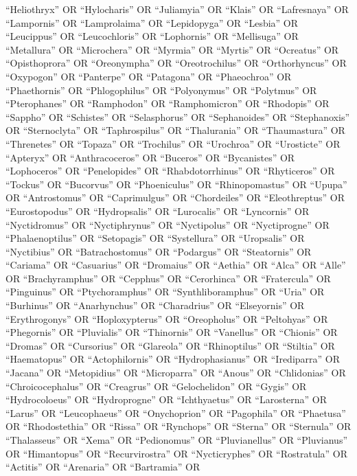\documentclass[
  number,
  review,
  onecolumn]{elsarticle}
\begin{document}
``Heliothryx'' OR ``Hylocharis'' OR ``Juliamyia'' OR ``Klais'' OR
``Lafresnaya'' OR ``Lampornis'' OR ``Lamprolaima'' OR ``Lepidopyga'' OR
``Lesbia'' OR ``Leucippus'' OR ``Leucochloris'' OR ``Lophornis'' OR
``Mellisuga'' OR ``Metallura'' OR ``Microchera'' OR ``Myrmia'' OR
``Myrtis'' OR ``Ocreatus'' OR ``Opisthoprora'' OR ``Oreonympha'' OR
``Oreotrochilus'' OR ``Orthorhyncus'' OR ``Oxypogon'' OR ``Panterpe'' OR
``Patagona'' OR ``Phaeochroa'' OR ``Phaethornis'' OR ``Phlogophilus'' OR
``Polyonymus'' OR ``Polytmus'' OR ``Pterophanes'' OR ``Ramphodon'' OR
``Ramphomicron'' OR ``Rhodopis'' OR ``Sappho'' OR ``Schistes'' OR
``Selasphorus'' OR ``Sephanoides'' OR ``Stephanoxis'' OR ``Sternoclyta''
OR ``Taphrospilus'' OR ``Thalurania'' OR ``Thaumastura'' OR
``Threnetes'' OR ``Topaza'' OR ``Trochilus'' OR ``Urochroa'' OR
``Urosticte'' OR ``Apteryx'' OR ``Anthracoceros'' OR ``Buceros'' OR
``Bycanistes'' OR ``Lophoceros'' OR ``Penelopides'' OR
``Rhabdotorrhinus'' OR ``Rhyticeros'' OR ``Tockus'' OR ``Bucorvus'' OR
``Phoeniculus'' OR ``Rhinopomastus'' OR ``Upupa'' OR ``Antrostomus'' OR
``Caprimulgus'' OR ``Chordeiles'' OR ``Eleothreptus'' OR
``Eurostopodus'' OR ``Hydropsalis'' OR ``Lurocalis'' OR ``Lyncornis'' OR
``Nyctidromus'' OR ``Nyctiphrynus'' OR ``Nyctipolus'' OR ``Nyctiprogne''
OR ``Phalaenoptilus'' OR ``Setopagis'' OR ``Systellura'' OR
``Uropsalis'' OR ``Nyctibius'' OR ``Batrachostomus'' OR ``Podargus'' OR
``Steatornis'' OR ``Cariama'' OR ``Casuarius'' OR ``Dromaius'' OR
``Aethia'' OR ``Alca'' OR ``Alle'' OR ``Brachyramphus'' OR ``Cepphus''
OR ``Cerorhinca'' OR ``Fratercula'' OR ``Pinguinus'' OR
``Ptychoramphus'' OR ``Synthliboramphus'' OR ``Uria'' OR ``Burhinus'' OR
``Anarhynchus'' OR ``Charadrius'' OR ``Elseyornis'' OR ``Erythrogonys''
OR ``Hoploxypterus'' OR ``Oreopholus'' OR ``Peltohyas'' OR ``Phegornis''
OR ``Pluvialis'' OR ``Thinornis'' OR ``Vanellus'' OR ``Chionis'' OR
``Dromas'' OR ``Cursorius'' OR ``Glareola'' OR ``Rhinoptilus'' OR
``Stiltia'' OR ``Haematopus'' OR ``Actophilornis'' OR ``Hydrophasianus''
OR ``Irediparra'' OR ``Jacana'' OR ``Metopidius'' OR ``Microparra'' OR
``Anous'' OR ``Chlidonias'' OR ``Chroicocephalus'' OR ``Creagrus'' OR
``Gelochelidon'' OR ``Gygis'' OR ``Hydrocoloeus'' OR ``Hydroprogne'' OR
``Ichthyaetus'' OR ``Larosterna'' OR ``Larus'' OR ``Leucophaeus'' OR
``Onychoprion'' OR ``Pagophila'' OR ``Phaetusa'' OR ``Rhodostethia'' OR
``Rissa'' OR ``Rynchops'' OR ``Sterna'' OR ``Sternula'' OR
``Thalasseus'' OR ``Xema'' OR ``Pedionomus'' OR ``Pluvianellus'' OR
``Pluvianus'' OR ``Himantopus'' OR ``Recurvirostra'' OR ``Nycticryphes''
OR ``Rostratula'' OR ``Actitis'' OR ``Arenaria'' OR ``Bartramia'' OR
\end{document}
